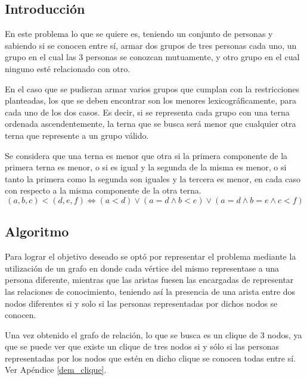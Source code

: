\documentclass[a4paper, 12pt]{article}
\begin{document}
\subsection*{Introducción}


En este problema lo que se quiere es, teniendo un conjunto de personas y sabiendo si se conocen entre sí, armar dos grupos de tres personas cada uno, un grupo en el cual las 3 personas se conozcan mutuamente, y otro grupo en el cual ninguno esté relacionado con otro.


En el caso que se pudieran armar varios grupos que cumplan con la restricciones planteadas, los que se deben encontrar son los menores lexicográficamente, para cada uno de los dos casos. Es decir, si se representa cada grupo con una terna ordenada ascendentemente, la terna que se busca será menor que cualquier otra terna que represente a un grupo válido.

Se considera que una terna es menor que otra si la primera componente de la primera terna es menor, o si es igual y la segunda de la misma es menor, o si tanto la primera como la segunda son iguales y la tercera es menor, en cada caso con respecto a la misma componente de la otra terna.
\begin{displaymath}
\left(a, b, c \right) < \left( d, e, f\right) \Leftrightarrow 
\left( a < d \right) \vee \left( a = d \wedge b < e \right) \vee \left( a = d \wedge b = e \wedge c < f \right)
\end{displaymath}


\subsection*{Algoritmo}

Para lograr el objetivo deseado se optó por representar el problema mediante la utilización de un grafo en donde cada vértice del mismo representase a una persona diferente, mientras que las aristas fuesen las encargadas de representar las relaciones de conocimiento, teniendo así la presencia de una arista entre dos nodos diferentes si y solo si las personas representadas por dichos nodos se conocen.


Una vez obtenido el grafo de relación, lo que se busca es un clique de 3 nodos, ya que se puede ver que existe un clique de tres nodos si y sólo si las personas representadas por los nodos que estén en dicho clique se conocen todas entre sí. Ver Apéndice \ref{dem_clique}.
\end{document}
